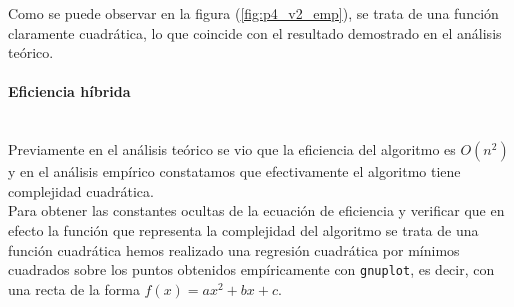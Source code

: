 \documentclass{article}
\newcommand{\myparagraph}[1]{\paragraph{#1}\mbox{}\\}
\begin{document}
Como se puede observar en la figura (\ref{fig:p4_v2_emp}), se trata de una función claramente cuadrática, lo que coincide con el resultado demostrado en el análisis teórico.

\myparagraph{Eficiencia híbrida}
Previamente en el análisis teórico se vio que la eficiencia del algoritmo es $O(n^{2})$ y en el análisis empírico constatamos que efectivamente el algoritmo tiene complejidad cuadrática. \\

Para obtener las constantes ocultas de la ecuación de eficiencia y verificar que en efecto la función que representa la complejidad del algoritmo se trata de una función cuadrática hemos realizado una regresión cuadrática por mínimos cuadrados sobre los puntos obtenidos empíricamente con \verb|gnuplot|, es decir, con una recta de la forma $f(x) = ax^{2} + bx + c$.\\
\end{document}
